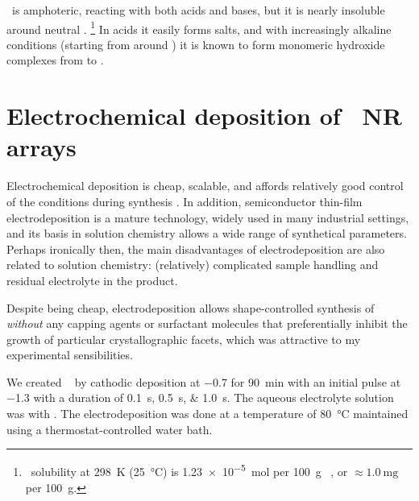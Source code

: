 \documentclass[draft,webedition,openright,titles,swedish,english]{LuaUUThesis}\usepackage[]{graphicx}\usepackage[]{xcolor}
\begin{document}
\ZnO\ is amphoteric, reacting with both acids and bases, but it is nearly insoluble
around neutral \pH.%
\footnote{%
   \ZnO\ solubility at \qty{298}{\kelvin} (\qty{25}{\celsius}) is
   \qty{1.23e-5}{\mol} per \qty{100}{\gram} \water\ \cite{Ellis1984},
   or ${\approx}\qty{1.0}{\mg}$ per \qty{100}{\gram}.}
In acids it easily forms salts,
and with increasingly alkaline conditions (starting from around )
it is known to form monomeric hydroxide complexes from  to 
\cite{Greenwood1997,Ekberg2016}.




\section[Electrodeposition of ZnO NR arrays]{\texorpdfstring{Electrochemical deposition of \ZnO\ NR arrays}{Electrochemical deposition of ZnO NR arrays}}
\label{synthesis:electrodeposition}

Electrochemical deposition is cheap, scalable, and affords
relatively good control of the conditions during synthesis \cite{Schwarzacher2006}.
In addition, semiconductor thin-film electrodeposition is a mature technology,
widely used in many industrial settings, and its basis in solution chemistry
allows a wide range of synthetical parameters.
Perhaps ironically then, the main disadvantages of electrodeposition
are also related to solution chemistry: (relatively) complicated sample handling and residual
electrolyte in the product.

Despite being cheap, electrodeposition allows
shape-controlled synthesis of \ZnO\  \emph{without}
any capping agents or surfactant molecules that preferentially inhibit the
growth of particular crystallographic facets, which was attractive to my
experimental sensibilities.

We created \ZnO\  by cathodic deposition at \qty{-0.7}{\voltAgCl}
for \qty{90}{\minute} with an initial pulse at \qty{-1.3}{\voltAgCl} with a duration
of \qtylist[list-final-separator={ or }]{0.1;0.5;1.0}{\second}.
The aqueous electrolyte solution was
with .
The electrodeposition was done at a temperature of \qty{80}{\celsius} maintained
using a thermostat-controlled water bath.
\end{document}
